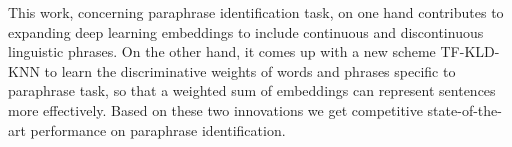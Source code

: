 This work, concerning paraphrase identification task, on one hand contributes to expanding deep learning embeddings to include continuous and discontinuous linguistic phrases. On the other hand, it comes up with a new scheme TF-KLD-KNN to learn the discriminative weights of words and phrases specific to paraphrase task, so that a weighted sum of embeddings can represent sentences more effectively.  Based on these two innovations we get competitive state-of-the-art performance on paraphrase identification.
